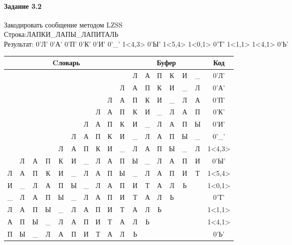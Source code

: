 \documentclass[a4paper, 12pt]{article}
\begin{document}
\paragraph{Задание 3.2}

Закодировать сообщение методом LZSS\\
Строка:ЛАПКИ\_ЛАПЫ\_ЛАПИТАЛЬ\\
Результат: 0'Л' 0'А' 0'П' 0'К' 0'И' 0'\_' 1<4,3> 0'Ы' 1<5,4> 1<0,1> 0'Т' 1<1,1> 1<4,1> 0'Ь'\\
\begin{table}[h!]
\centering
\begin{tabular}{|c|c|c|c|c|c|c|c|c|c|c|c|c|c|c|c|c|}
\hline
\multicolumn{10}{|c|}{Cловарь} & \multicolumn{6}{c|}{Буфер} & Код  \\ \hline
  &   &   &   &   &   &   &   &   &   & Л & А & П & К & И & \_ & 0'Л'\\ \hline
  &   &   &   &   &   &   &   &   & Л & А & П & К & И & \_ & Л & 0'А'\\ \hline
  &   &   &   &   &   &   &   & Л & А & П & К & И & \_ & Л & А & 0'П'\\ \hline
  &   &   &   &   &   &   & Л & А & П & К & И & \_ & Л & А & П & 0'К'\\ \hline
  &   &   &   &   &   & Л & А & П & К & И & \_ & Л & А & П & Ы & 0'И'\\ \hline
  &   &   &   &   & Л & А & П & К & И & \_ & Л & А & П & Ы & \_ & 0'\_'\\ \hline
  &   &   &   & \cellcolor[HTML]{FFFF00} Л & \cellcolor[HTML]{FFFF00} А & \cellcolor[HTML]{FFFF00} П & К & И & \_ & \cellcolor[HTML]{FFFF00} Л & \cellcolor[HTML]{FFFF00} А & \cellcolor[HTML]{FFFF00} П & Ы & \_ & Л & 1<4,3>\\ \hline
  & Л & А & П & К & И & \_ & Л & А & П & Ы & \_ & Л & А & П & И & 0'Ы'\\ \hline
Л & А & П & К & И & \cellcolor[HTML]{FFFF00} \_ & \cellcolor[HTML]{FFFF00} Л & \cellcolor[HTML]{FFFF00} А & \cellcolor[HTML]{FFFF00} П & Ы & \cellcolor[HTML]{FFFF00} \_ & \cellcolor[HTML]{FFFF00} Л & \cellcolor[HTML]{FFFF00} А & \cellcolor[HTML]{FFFF00} П & И & Т & 1<5,4>\\ \hline
\cellcolor[HTML]{FFFF00} И & \_ & Л & А & П & Ы & \_ & Л & А & П & \cellcolor[HTML]{FFFF00} И & Т & А & Л & Ь &   & 1<0,1>\\ \hline
\_ & Л & А & П & Ы & \_ & Л & А & П & И & Т & А & Л & Ь &   &   & 0'Т'\\ \hline
Л & \cellcolor[HTML]{FFFF00} А & П & Ы & \_ & Л & А & П & И & Т & \cellcolor[HTML]{FFFF00} А & Л & Ь &   &   &   & 1<1,1>\\ \hline
А & П & Ы & \_ & \cellcolor[HTML]{FFFF00} Л & А & П & И & Т & А & \cellcolor[HTML]{FFFF00} Л & Ь &   &   &   &   & 1<4,1>\\ \hline
П & Ы & \_ & Л & А & П & И & Т & А & Л & Ь &   &   &   &   &   & 0'Ь'\\ \hline
\end{tabular}
\end{table}
\end{document}

